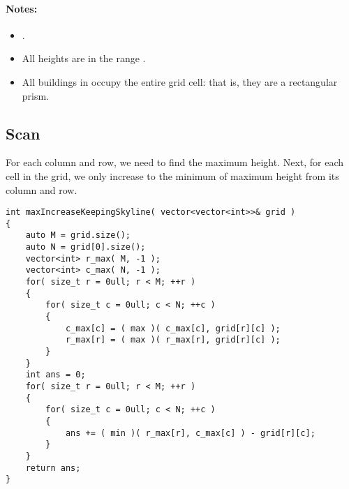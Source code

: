 \paragraph{Notes:}

\begin{itemize}
\item {}.
\item All heights  are in the range \fcj{[0, 100]}.
\item All buildings in  occupy the entire grid cell: that is, they are a  rectangular prism.
\end{itemize}

\subsection{Scan}
For each column and row, we need to find the maximum height. Next, for each cell in the grid, we only increase to the minimum of maximum height from its column and row.

\setcounter{lstlisting}{0}
\begin{lstlisting}[style=customc, caption={Scan}]
int maxIncreaseKeepingSkyline( vector<vector<int>>& grid )
{
    auto M = grid.size();
    auto N = grid[0].size();
    vector<int> r_max( M, -1 );
    vector<int> c_max( N, -1 );
    for( size_t r = 0ull; r < M; ++r )
    {
        for( size_t c = 0ull; c < N; ++c )
        {
            c_max[c] = ( max )( c_max[c], grid[r][c] );
            r_max[r] = ( max )( r_max[r], grid[r][c] );
        }
    }
    int ans = 0;
    for( size_t r = 0ull; r < M; ++r )
    {
        for( size_t c = 0ull; c < N; ++c )
        {
            ans += ( min )( r_max[r], c_max[c] ) - grid[r][c];
        }
    }
    return ans;
}
\end{lstlisting}
